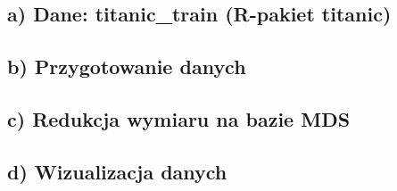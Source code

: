 \documentclass[
  12pt,
]{article}
\begin{document}
\subsection{a) Dane: titanic\_train (R-pakiet
titanic)}\label{a-dane-titanic_train-r-pakiet-titanic}

\subsection{b) Przygotowanie danych}\label{b-przygotowanie-danych-1}

\subsection{c) Redukcja wymiaru na bazie
MDS}\label{c-redukcja-wymiaru-na-bazie-mds}

\subsection{d) Wizualizacja danych}\label{d-wizualizacja-danych}
\end{document}
